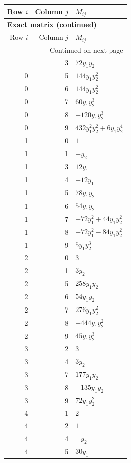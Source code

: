 \documentclass[10pt,a4paper]{article}
\begin{document}
{\small\setlength{\tabcolsep}{7pt}\begin{longtable}{rrp{125mm}}
\toprule Row $i$ & Column $j$ & $M_{ij}$\\\midrule\endfirsthead
\multicolumn{3}{l}{\textbf{Exact matrix (continued)}}\\
\toprule Row $i$ & Column $j$ & $M_{ij}$\\\midrule\endhead
\midrule\multicolumn{3}{r}{Continued on next page}\\\endfoot\bottomrule\endlastfoot
0 & 3 & $72 y_{1} y_{2}$\\
0 & 5 & $144 y_{1} y_{2}^{2}$\\
0 & 6 & $144 y_{1} y_{2}^{2}$\\
0 & 7 & $60 y_{1} y_{2}^{3}$\\
0 & 8 & $- 120 y_{1} y_{2}^{3}$\\
0 & 9 & $432 y_{1}^{2} y_{2}^{2} + 6 y_{1} y_{2}^{4}$\\
1 & 0 & $1$\\
1 & 1 & $- y_{2}$\\
1 & 3 & $12 y_{1}$\\
1 & 4 & $- 12 y_{1}$\\
1 & 5 & $78 y_{1} y_{2}$\\
1 & 6 & $54 y_{1} y_{2}$\\
1 & 7 & $- 72 y_{1}^{2} + 44 y_{1} y_{2}^{2}$\\
1 & 8 & $- 72 y_{1}^{2} - 84 y_{1} y_{2}^{2}$\\
1 & 9 & $5 y_{1} y_{2}^{3}$\\
2 & 0 & $3$\\
2 & 1 & $3 y_{2}$\\
2 & 5 & $258 y_{1} y_{2}$\\
2 & 6 & $54 y_{1} y_{2}$\\
2 & 7 & $276 y_{1} y_{2}^{2}$\\
2 & 8 & $- 444 y_{1} y_{2}^{2}$\\
2 & 9 & $45 y_{1} y_{2}^{3}$\\
3 & 2 & $3$\\
3 & 4 & $3 y_{2}$\\
3 & 7 & $177 y_{1} y_{2}$\\
3 & 8 & $- 135 y_{1} y_{2}$\\
3 & 9 & $72 y_{1} y_{2}^{2}$\\
4 & 1 & $2$\\
4 & 2 & $1$\\
4 & 4 & $- y_{2}$\\
4 & 5 & $30 y_{1}$\\

\end{longtable}}
\end{document}
